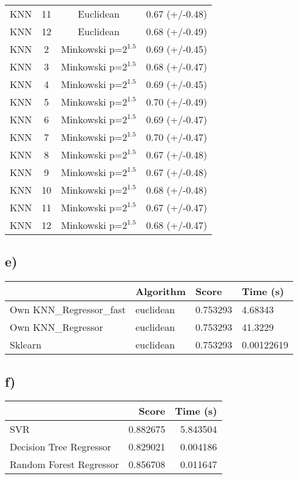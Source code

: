 \documentclass{article}
\begin{document}
\begin{tabular}{cccc}
          KNN &         11 &              Euclidean &  0.67 (+/-0.48) \\
          KNN &         12 &              Euclidean &  0.68 (+/-0.49) \\
          KNN &          2 &  Minkowski p=$2^{1.5}$ &  0.69 (+/-0.45) \\
          KNN &          3 &  Minkowski p=$2^{1.5}$ &  0.68 (+/-0.47) \\
          KNN &          4 &  Minkowski p=$2^{1.5}$ &  0.69 (+/-0.45) \\
          KNN &          5 &  Minkowski p=$2^{1.5}$ &  0.70 (+/-0.49) \\
          KNN &          6 &  Minkowski p=$2^{1.5}$ &  0.69 (+/-0.47) \\
          KNN &          7 &  Minkowski p=$2^{1.5}$ &  0.70 (+/-0.47) \\
          KNN &          8 &  Minkowski p=$2^{1.5}$ &  0.67 (+/-0.48) \\
          KNN &          9 &  Minkowski p=$2^{1.5}$ &  0.67 (+/-0.48) \\
          KNN &         10 &  Minkowski p=$2^{1.5}$ &  0.68 (+/-0.48) \\
          KNN &         11 &  Minkowski p=$2^{1.5}$ &  0.67 (+/-0.47) \\
          KNN &         12 &  Minkowski p=$2^{1.5}$ &  0.68 (+/-0.47) \\
          \bottomrule
        \end{tabular}

        \subsection{e)}
          \begin{tabular}{llll}
            \toprule
            {} &  Algorithm &     Score &    Time (s) \\
            \midrule
            Own KNN\_Regressor\_fast &  euclidean &  0.753293 &     4.68343 \\
            Own KNN\_Regressor      &  euclidean &  0.753293 &     41.3229 \\
            Sklearn                &  euclidean &  0.753293 &  0.00122619 \\
            \bottomrule
          \end{tabular}

        \subsection{f)}
          \begin{tabular}{lrr}
            \toprule
            {} &     Score &  Time (s) \\
            \midrule
            SVR                     &  0.882675 &  5.843504 \\
            Decision Tree Regressor &  0.829021 &  0.004186 \\
            Random Forest Regressor &  0.856708 &  0.011647 \\
            \bottomrule
          \end{tabular}
\end{document}
